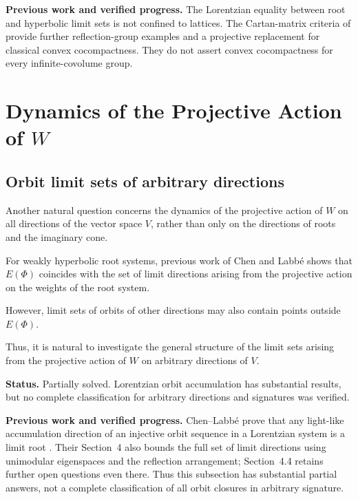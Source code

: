 \documentclass[11pt,reqno]{amsart}
\theoremstyle{plain}
\theoremstyle{definition}
\theoremstyle{remark}
\numberwithin{equation}{section}
\begin{document}
\par\medskip
\noindent\textbf{Previous work and verified progress.}
The Lorentzian equality between root and hyperbolic limit sets
\cite{HPR2020} is not confined to lattices. The Cartan-matrix criteria
of \cite[Theorems~1.3 and~1.8]{DGKLM2025} provide further reflection-group
examples and a projective replacement for classical convex cocompactness.
They do not assert convex cocompactness for every infinite-covolume group.

\section{Dynamics of the Projective Action of \texorpdfstring{$W$}{W}}

\subsection{Orbit limit sets of arbitrary directions}

Another natural question concerns the dynamics of the
projective action of $W$ on all directions of the vector
space $V$, rather than only on the directions of roots
and the imaginary cone.

For weakly hyperbolic root systems, previous work of
Chen and Labbé shows that $E(\Phi)$ coincides with
the set of limit directions arising from the projective
action on the weights of the root system.

However, limit sets of orbits of other directions may
also contain points outside $E(\Phi)$.

Thus, it is natural to investigate the general structure
of the limit sets arising from the projective action
of $W$ on arbitrary directions of $V$.


\par\medskip
\noindent\textbf{Status.} Partially solved. Lorentzian orbit accumulation has substantial results, but no complete classification for arbitrary directions and signatures was verified.

\par\medskip
\noindent\textbf{Previous work and verified progress.}
Chen--Labb\'e prove that any light-like accumulation direction of
an injective orbit sequence in a Lorentzian system is a limit root
\cite[Theorem~2.6]{ChenLabbe2017}. Their Section~4 also bounds the full set of
limit directions using unimodular eigenspaces and the reflection
arrangement; Section~4.4 retains further open questions even there.
Thus this subsection has substantial partial answers, not a complete
classification of all orbit closures in arbitrary signature.
\end{document}
